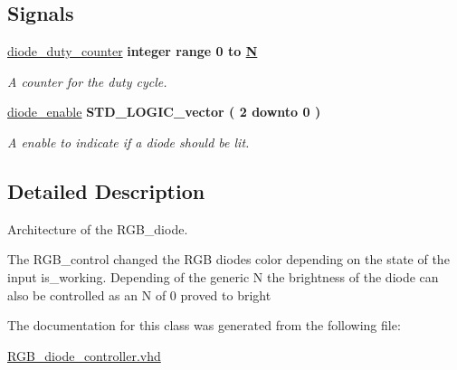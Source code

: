 \subsection*{Signals}
 \begin{DoxyCompactItemize}
\item 
\hypertarget{classRGB__diode__controller_1_1diode_a36d6c358f271c34f9fba99138b3bddf2}{\hyperlink{classRGB__diode__controller_1_1diode_a36d6c358f271c34f9fba99138b3bddf2}{diode\-\_\-duty\-\_\-counter} {\bfseries \textcolor{comment}{integer}\textcolor{vhdlchar}{ }\textcolor{vhdlkeyword}{range}\textcolor{vhdlchar}{ } \textcolor{vhdldigit}{0} \textcolor{vhdlchar}{ }\textcolor{vhdlchar}{ }\textcolor{vhdlchar}{ }\textcolor{vhdlkeyword}{to}\textcolor{vhdlchar}{ }\textcolor{vhdlchar}{ }\textcolor{vhdlchar}{ }{\bfseries \hyperlink{classRGB__diode__controller_ad3971b999c08c97da803416025fcebb0}{N}} \textcolor{vhdlchar}{ }} }\label{classRGB__diode__controller_1_1diode_a36d6c358f271c34f9fba99138b3bddf2}

\begin{DoxyCompactList}\small\item\em A counter for the duty cycle. \end{DoxyCompactList}\item 
\hypertarget{classRGB__diode__controller_1_1diode_a471ca34f0f3e1757f74b6c21eb6c97ed}{\hyperlink{classRGB__diode__controller_1_1diode_a471ca34f0f3e1757f74b6c21eb6c97ed}{diode\-\_\-enable} {\bfseries \textcolor{comment}{S\-T\-D\-\_\-\-L\-O\-G\-I\-C\-\_\-vector}\textcolor{vhdlchar}{ }\textcolor{vhdlchar}{(}\textcolor{vhdlchar}{ }\textcolor{vhdlchar}{ } \textcolor{vhdldigit}{2} \textcolor{vhdlchar}{ }\textcolor{vhdlchar}{ }\textcolor{vhdlchar}{ }\textcolor{vhdlkeyword}{downto}\textcolor{vhdlchar}{ }\textcolor{vhdlchar}{ }\textcolor{vhdlchar}{ } \textcolor{vhdldigit}{0} \textcolor{vhdlchar}{ }\textcolor{vhdlchar}{)}\textcolor{vhdlchar}{ }} }\label{classRGB__diode__controller_1_1diode_a471ca34f0f3e1757f74b6c21eb6c97ed}

\begin{DoxyCompactList}\small\item\em A enable to indicate if a diode should be lit. \end{DoxyCompactList}\end{DoxyCompactItemize}


\subsection{Detailed Description}
Architecture of the R\-G\-B\-\_\-diode. 

The R\-G\-B\-\_\-control changed the R\-G\-B diodes color depending on the state of the input is\-\_\-working. Depending of the generic N the brightness of the diode can also be controlled as an N of 0 proved to bright 

The documentation for this class was generated from the following file\-:\begin{DoxyCompactItemize}
\item 
\hyperlink{RGB__diode__controller_8vhd}{R\-G\-B\-\_\-diode\-\_\-controller.\-vhd}\end{DoxyCompactItemize}
